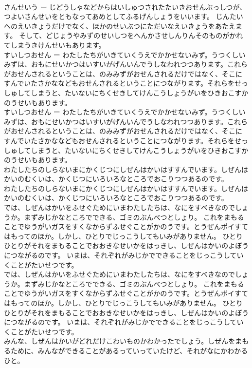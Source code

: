 \documentclass[8pt]{extreport}
\begin{document}
\begin{CJK}{UTF8}{min}
\\	さんせいう ー じどうしゃなどからはいしゅつされたたいきおせんぶっしつが、つよいさんせいをともなってあめとしてふるげんしょうをいいます。 じんたいへのえいきょうだけでなく、ほかのせいぶつにただいなえいきょうをあたえます。 そして、どじょうやみずのせいしつをへんかさせしんりんそのものがかれてしまうきけんせいもあります。 
\\	すいしつおせん ー わたしたちがいきていくうえでかかせないみず。うつくしいみずは、おもにせいかつはいすいがげんいんでうしなわれつつあります。これらがおせんされるということは、のみみずがおせんされるだけではなく、そこにすんでいたさかななどもおせんされるということにつながります。それらをせっしゅしてしまうと、たいないにちくせきしてけんこうしょうがいをひきおこすかのうせいもあります。	
\\	すいしつおせん ー わたしたちがいきていくうえでかかせないみず。うつくしいみずは、おもにせいかつはいすいがげんいんでうしなわれつつあります。これらがおせんされるということは、のみみずがおせんされるだけではなく、そこにすんでいたさかななどもおせんされるということにつながります。それらをせっしゅしてしまうと、たいないにちくせきしてけんこうしょうがいをひきおこすかのうせいもあります。 
\\	わたしたちのしらないまにかくじつにしぜんはかいはすすんでいます。しぜんはかいのむくいは、かくじつにいろいろなところでおこりつつあるのです。	
\\	わたしたちのしらないまにかくじつにしぜんはかいはすすんでいます。しぜんはかいのむくいは、かくじつにいろいろなところでおこりつつあるのです。 
\\	では、しぜんはかいをふせぐためにいまわたしたちは、なにをすべきなのでしょうか。まずみじかなところでできる、ゴミのぶんべつとしょり。 これをまもることでゆうがいガスをすくなからずふせぐことがかのうです。とうぜんポイすてはもってのほか。しかし、ひとりでじっこうしてもいみがありません。 ひとりひとりがそれをまもることでおおきなせいかをはっきし、しぜんはかいのよぼうにつながるのです。 いまは、それぞれがみじかでできることをじっこうしていくことがたいせつです。	
\\	では、しぜんはかいをふせぐためにいまわたしたちは、なにをすべきなのでしょうか。まずみじかなところでできる、ゴミのぶんべつとしょり。 これをまもることでゆうがいガスをすくなからずふせぐことがかのうです。とうぜんポイすてはもってのほか。しかし、ひとりでじっこうしてもいみがありません。 ひとりひとりがそれをまもることでおおきなせいかをはっきし、しぜんはかいのよぼうにつながるのです。 いまは、それぞれがみじかでできることをじっこうしていくことがたいせつです。 
\\	みんな、しぜんはかいがどれだけこわいものかわかったでしょう。しぜんをまもるために、みんなができることがあるっていっていたけど、それがなにかわかるひと。	

\end{CJK}
\end{document}
